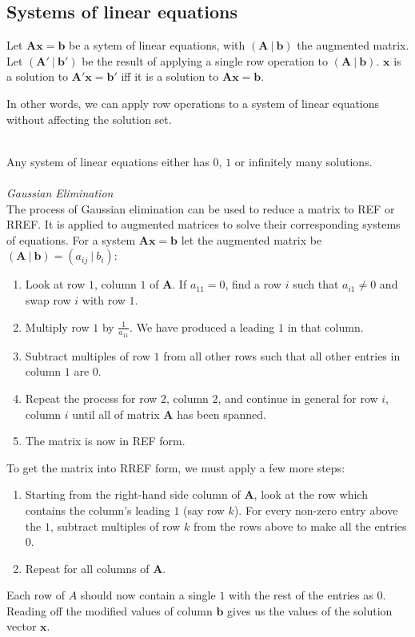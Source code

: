 \documentclass{scrartcl}
\renewcommand{\vec}[1]{\mathbf{#1}}
\begin{document}
\subsection{Systems of linear equations}

Let $ \vec{Ax = b} $ be a sytem of linear equations, with $ (\vec{A} \ | \ \vec{b}) $ the augmented matrix. Let $ (\vec{A'} \ | \ \vec{b'}) $ be the result of applying a single row operation to $ (\vec{A} \ | \ \vec{b}) $. $ \vec{x} $ is a solution to $ \vec{A'x = b'} $ iff it is a solution to $ \vec{Ax = b} $.
\\
\begin{tcolorbox}[breakable]
In other words, we can apply row operations to a system of linear equations without affecting the solution set.
\end{tcolorbox}
\noindent
\\
Any system of linear equations either has $ 0 $, $ 1 $ or infinitely many solutions.
\\\\
\textit{Gaussian Elimination}
\\
The process of Gaussian elimination can be used to reduce a matrix to REF or RREF. It is applied to augmented matrices to solve their corresponding systems of equations. For a system $ \vec{Ax = b} $ let the augmented matrix be $ (\vec{A} \ | \ \vec{b}) = (a_{ij} \ | \ b_{i}) $:
\begin{enumerate}
\item Look at row $ 1 $, column $ 1 $ of $ \vec{A} $. If $ a_{11} = 0 $, find a row $ i $ such that $ a_{i1} \neq 0 $ and swap row $ i $ with row $ 1 $.
\item Multiply row $ 1 $ by $ \frac{1}{a_{11}} $. We have produced a leading $ 1 $ in that column.
\item Subtract multiples of row $ 1 $ from all other rows such that all other entries in column $ 1 $ are $ 0 $.
\item Repeat the process for row $ 2 $, column $ 2 $, and continue in general for row $ i $, column $ i $ until all of matrix $ \vec{A} $ has been spanned.
\item The matrix is now in REF form.
\end{enumerate}
To get the matrix into RREF form, we must apply a few more steps:
\begin{enumerate}[resume]
\item Starting from the right-hand side column of $ \vec{A} $, look at the row which contains the column's leading $ 1 $ (say row $ k $). For every non-zero entry above the $ 1 $, subtract multiples of row $ k $ from the rows above to make all the entries $ 0 $.
\item Repeat for all columns of $ \vec{A} $.
\end{enumerate}
Each row of $ A $ should now contain a single $ 1 $ with the rest of the entries as $ 0 $. Reading off the modified values of column $ \vec{b} $ gives us the values of the solution vector $ \vec{x} $.
\end{document}
